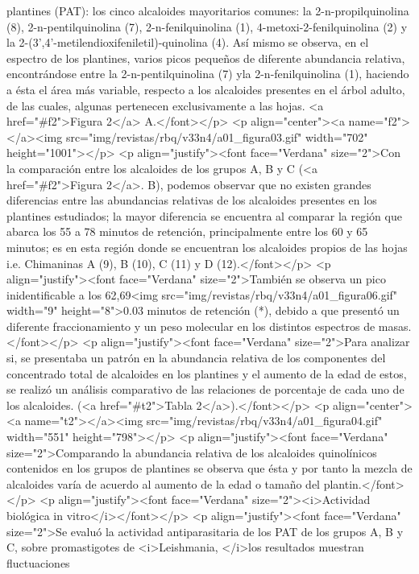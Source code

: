 plantines (PAT): los cinco alcaloides mayoritarios comunes: la
2-n-propilquinolina (8), 2-n-pentilquinolina (7), 2-n-fenilquinolina (1),
4-metoxi-2-fenilquinolina (2) y la 2-(3',4'-metilendioxifeniletil)-quinolina
(4). Así mismo se observa, en el espectro de los plantines, varios picos
pequeños de diferente abundancia relativa, encontrándose entre la
2-n-pentilquinolina (7) yla 2-n-fenilquinolina (1), haciendo a ésta el área más
variable, respecto a los alcaloides presentes en el árbol adulto, de las cuales,
algunas pertenecen exclusivamente a las hojas. <a href="\#f2">Figura 2</a>
A.</font></p> <p align="center"><a name="f2"></a><img
src="img/revistas/rbq/v33n4/a01\_{}figura03.gif" width="702" height="1001"></p>
<p align="justify"><font face="Verdana" size="2">Con la comparación entre los
alcaloides de los grupos A, B y C (<a href="\#f2">Figura 2</a>. B), podemos
observar que no existen grandes diferencias entre las abundancias relativas de
los alcaloides presentes en los plantines estudiados; la mayor diferencia se
encuentra al comparar la región que abarca los 55 a 78 minutos de retención,
principalmente entre los 60 y 65 minutos; es en esta región donde se encuentran
los alcaloides propios de las hojas i.e. Chimaninas A (9), B (10), C (11) y D
(12).</font></p> <p align="justify"><font face="Verdana" size="2">También se
observa un pico inidentificable a los 62,69<img
src="img/revistas/rbq/v33n4/a01\_{}figura06.gif" width="9" height="8">0.03
minutos de retención (*), debido a que presentó un diferente fraccionamiento y
un peso molecular en los distintos espectros de masas.</font></p> <p
align="justify"><font face="Verdana" size="2">Para analizar si, se presentaba un
patrón en la abundancia relativa de los componentes del concentrado total de
alcaloides en los plantines y el aumento de la edad de estos, se realizó un
análisis comparativo de las relaciones de porcentaje de cada uno de los
alcaloides. (<a href="\#t2">Tabla 2</a>).</font></p> <p align="center"><a
name="t2"></a><img src="img/revistas/rbq/v33n4/a01\_{}figura04.gif" width="551"
height="798"></p> <p align="justify"><font face="Verdana" size="2">Comparando la
abundancia relativa de los alcaloides quinolínicos contenidos en los grupos de
plantines se observa que ésta y por tanto la mezcla de alcaloides varía de
acuerdo al aumento de la edad o tamaño del plantin.</font></p> <p
align="justify"><font face="Verdana" size="2"><i>Actividad biológica in
vitro</i></font></p> <p align="justify"><font face="Verdana" size="2">Se evaluó
la actividad antiparasitaria de los PAT de los grupos A, B y C, sobre
promastigotes de <i>Leishmania, </i>los resultados muestran fluctuaciones
